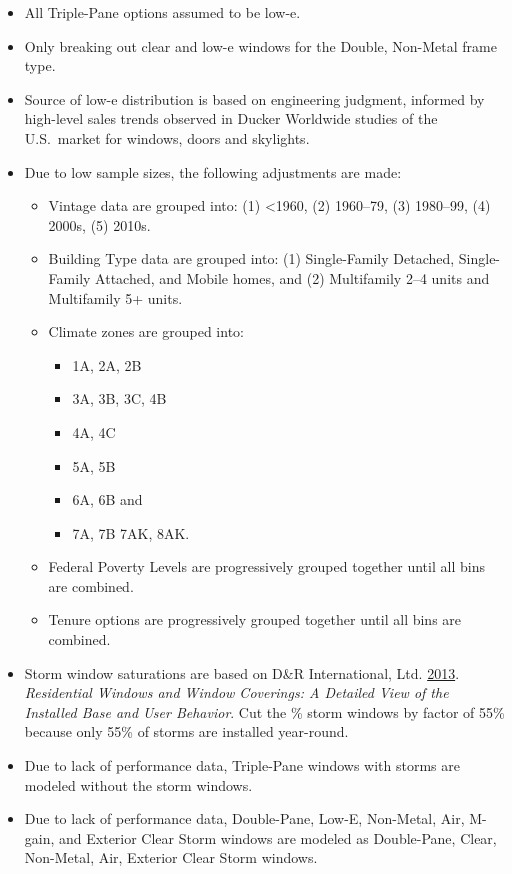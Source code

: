 \begin{itemize}

\item
  All Triple-Pane options assumed to be low-e.
\item
  Only breaking out clear and low-e windows for the Double, Non-Metal
  frame type.
\item
  Source of low-e distribution is based on engineering judgment,
  informed by high-level sales trends observed in Ducker Worldwide
  studies of the U.S.~market for windows, doors and skylights.
\item
  Due to low sample sizes, the following adjustments are made:

  \begin{itemize}
   
  \item
    Vintage data are grouped into: (1) \textless1960, (2) 1960--79,
    (3) 1980--99, (4) 2000s, (5) 2010s.
  \item
    Building Type data are grouped into: (1) Single-Family
    Detached, Single-Family Attached, and Mobile homes, and (2)
    Multifamily 2--4 units and Multifamily 5+ units.
  \item
    Climate zones are grouped into: 
    \begin{itemize}
        \item 1A, 2A, 2B
  
\item 3A, 3B, 3C, 4B
\item 4A, 4C
\item 5A, 5B
\item6A, 6B and
\item 7A, 7B 7AK, 8AK.
  \end{itemize}
  \end{itemize}

  \begin{itemize}
   
  \item
    Federal Poverty Levels are progressively grouped together
    until all bins are combined.
  \item
    Tenure options are progressively grouped together until all
    bins are combined.
  \end{itemize}
\item
  Storm window saturations are based on D\&R International, Ltd. \href{https://www.energy.gov/sites/prod/files/2013/11/f5/residential_windows_coverings.pdf}{2013}.
 \textit{Residential Windows and Window Coverings: A Detailed
  View of the Installed Base and User Behavior}. Cut the \% storm windows by factor of 55\% because only 55\% of storms
  are installed year-round.
\item
  Due to lack of performance data, Triple-Pane windows with storms are
  modeled without the storm windows.
\item
  Due to lack of performance data, Double-Pane, Low-E, Non-Metal, Air,
  M-gain, and Exterior Clear Storm windows are modeled as Double-Pane,
  Clear, Non-Metal, Air, Exterior Clear Storm windows.
\end{itemize}
